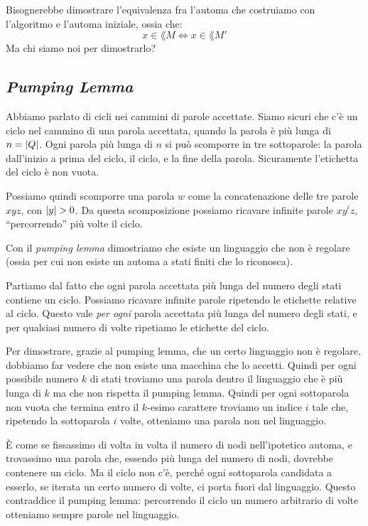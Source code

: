 Bisognerebbe dimostrare l'equivalenza fra l'automa che costruiamo con l'algoritmo e l'automa iniziale, ossia che:
\[
	x \in \lang{M} \iff x \in \lang{M'}
\]
Ma chi siamo noi per dimostrarlo?

\subsection{\emph{Pumping Lemma}}

Abbiamo parlato di cicli nei cammini di parole accettate.
Siamo sicuri che c'\`e un ciclo nel cammino di una parola accettata, quando la parola \`e pi\`u lunga di $n = \left\lvert{Q}\right\rvert$.
Ogni parola pi\`u lunga di $n$ si pu\`o scomporre in tre sottoparole: la parola dall'inizio a prima del ciclo, il ciclo, e la fine della parola.
Sicuramente l'etichetta del ciclo \`e non vuota.

Possiamo quindi scomporre una parola $w$ come la concatenazione delle tre parole $xyz$, con $\left\lvert{y}\right\rvert > 0$.
Da questa scomposizione possiamo ricavare infinite parole $x y^i z$, ``percorrendo'' pi\`u volte il ciclo.

Con il \emph{pumping lemma} dimostriamo che esiste un linguaggio che non \`e regolare (ossia per cui non esiste un automa a stati finiti che lo riconosca).

Partiamo dal fatto che ogni parola accettata pi\`u lunga del numero degli stati contiene un ciclo.
Possiamo ricavare infinite parole ripetendo le etichette relative al ciclo.
Questo vale \emph{per ogni} parola accettata pi\`u lunga del numero degli stati, e per qualsiasi numero di volte ripetiamo le etichette del ciclo.

Per dimostrare, grazie al pumping lemma, che un certo linguaggio non \`e regolare, dobbiamo far vedere che non esiste una macchina che lo accetti.
Quindi per ogni possibile numero $k$ di stati troviamo una parola dentro il linguaggio che \`e pi\`u lunga di $k$ ma che non rispetta il pumping lemma.
Quindi per ogni sottoparola non vuota che termina entro il $k$-esimo carattere troviamo un indice $i$ tale che, ripetendo la sottoparola $i$ volte, otteniamo una parola non nel linguaggio.

\`E come se fissassimo di volta in volta il numero di nodi nell'ipotetico automa, e trovassimo una parola che, essendo pi\`u lunga del numero di nodi, dovrebbe contenere un ciclo.
Ma il ciclo non c'\`e, perch\'e ogni sottoparola candidata a esserlo, se iterata un certo numero di volte, ci porta fuori dal linguaggio.
Questo contraddice il pumping lemma: percorrendo il ciclo un numero arbitrario di volte otteniamo sempre parole nel linguaggio.

